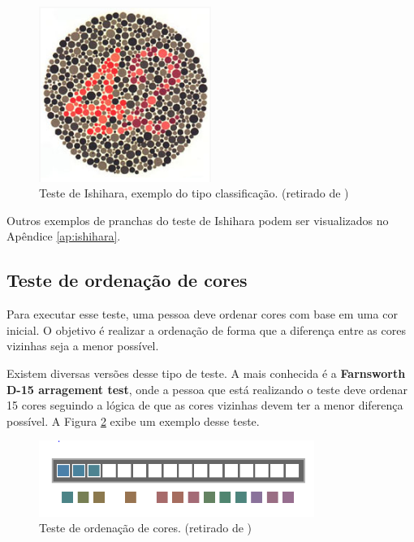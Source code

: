 \documentclass[	12pt, Times, openright, twoside, a4paper, english, brazil]{abntex2}
\begin{document}
\begin{itemize}
\begin{figure}[!htb]
\centering \includegraphics[width=0.5\textwidth]{figuraIshiharaClassificacao.png}
\caption{Teste de Ishihara, exemplo do tipo classificação. (retirado de ) \label{fig:figuraIshiharaClassificacao}}
\end{figure}

\end{itemize}

Outros exemplos de pranchas do teste de Ishihara podem ser visualizados no Apêndice \ref{ap:ishihara}.

\subsection{Teste de ordenação de cores}

Para executar esse teste, uma pessoa deve ordenar cores com base em uma cor inicial. O objetivo é realizar a ordenação de forma que a diferença entre as cores vizinhas seja a menor possível.

Existem diversas versões desse tipo de teste. A mais conhecida é a \textbf{Farnsworth D-15 arragement test}, onde a pessoa que está realizando o teste deve ordenar 15 cores seguindo a lógica de que as cores vizinhas devem ter a menor diferença possível. A Figura \ref{fig:figuraTesteOrdenacao} exibe um exemplo desse teste.

\begin{figure}[!htb]
\centering \includegraphics[width=0.8\textwidth]{figuraTesteOrdenacao.png}
\caption{Teste de ordenação de cores. (retirado de ) \label{fig:figuraTesteOrdenacao}}
\end{figure}
\end{document}
